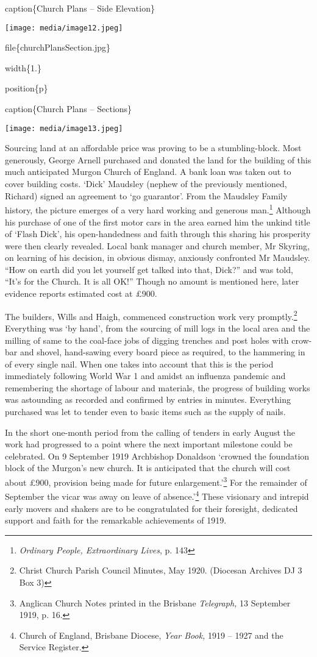 caption\{Church Plans -- Side Elevation\}

\texttt{[image: media/image12.jpeg]}

file\{churchPlansSection.jpg\}

width\{1.\}

position\{p\}

caption\{Church Plans -- Sections\}

\texttt{[image: media/image13.jpeg]}

Sourcing land at an affordable price was proving to be a stumbling-block. Most generously, George Arnell purchased and donated the land for the building of this much anticipated Murgon Church of England. A bank loan was taken out to cover building costs. `Dick' Maudsley (nephew of the previously mentioned, Richard) signed an agreement to `go guarantor'. From the Maudsley Family history, the picture emerges of a very hard working and generous man.\footnote{\emph{Ordinary People, Extraordinary Lives}, p. 143} Although his purchase of one of the first motor cars in the area earned him the unkind title of `Flash Dick', his open-handedness and faith through this sharing his prosperity were then clearly revealed. Local bank manager and church member, Mr Skyring, on learning of his decision, in obvious dismay, anxiously confronted Mr Maudsley. ``How on earth did you let yourself get talked into that, Dick?'' and was told, ``It's for the Church. It is all OK!'' Though no amount is mentioned here, later evidence reports estimated cost at £900.

The builders, Wills and Haigh, commenced construction work very promptly.\footnote{Christ Church Parish Council Minutes, May 1920. (Diocesan Archives DJ 3 Box 3)} Everything was `by hand', from the sourcing of mill logs in the local area and the milling of same to the coal-face jobs of digging trenches and post holes with crow-bar and shovel, hand-sawing every board piece as required, to the hammering in of every single nail. When one takes into account that this is the period immediately following World War 1 and amidst an influenza pandemic and remembering the shortage of labour and materials, the progress of building works was astounding as recorded and confirmed by entries in minutes. Everything purchased was let to tender even to basic items such as the supply of nails.

In the short one-month period from the calling of tenders in early August the work had progressed to a point where the next important milestone could be celebrated. On 9 September 1919 Archbishop Donaldson `crowned the foundation block of the Murgon's new church. It is anticipated that the church will cost about £900, provision being made for future enlargement.'\footnote{Anglican Church Notes printed in the Brisbane \emph{Telegraph,} 13 September 1919, p. 16.} For the remainder of September the vicar was away on leave of absence.'\footnote{Church of England, Brisbane Diocese, \emph{Year Book,} 1919 -- 1927 and the Service Register.} These visionary and intrepid early movers and shakers are to be congratulated for their foresight, dedicated support and faith for the remarkable achievements of 1919.

